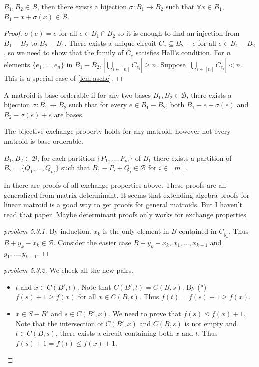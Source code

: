 \documentclass[12pt]{article}
\begin{document}
\begin{theorem}
    $B_1,B_2\in \mathcal B$, then there exists a bijection $\sigma: B_1\to B_2$ such that $\forall x\in B_1$, $B_1-x+\sigma(x)\in \mathcal B$.
\end{theorem}
\begin{proof}
    $\sigma(e)=e$ for all $e\in B_1\cap B_2$ so it is enough to find an injection from $B_1-B_2$ to $B_2-B_1$. There exists a unique circuit $C_e\subseteq B_2+e$ for all $e\in B_1-B_2$, so we need to show that the family of $C_e$ satisfies Hall's condition. For $n$ elements $\{e_1,\ldots,e_n\}$ in $B_1-B_2$, $|\bigcup_{i\in[n]}C_{e_i}|\geq n$. Suppose $|\bigcup_{i\in[n]}C_{e_i}|< n$. This is a special case of \autoref{lem:asche}.
    
\end{proof}
\begin{definition}
    A matroid is base-orderable if for any two bases $B_1,B_2\in \mathcal B$, there exists a bijection $\sigma: B_1\to B_2$ such that for every $e\in B_1-B_2$, both $B_1-e+\sigma(e)$ and $B_2-\sigma(e)+e$ are bases.
\end{definition}

The bijective exchange property holds for any matroid, however not every matroid is base-orderable.

\begin{theorem}
    $B_1,B_2\in \mathcal B$, for each partition $\{P_1,\dots,P_m\}$ of $B_1$ there exists a partition of $B_2=\{Q_1,\dots,Q_m\}$ such that $B_1-P_i+Q_i\in \mathcal B$ for $i\in [m]$.
\end{theorem}

In \cite{Greene_Magnanti_1975} there are proofs of all exchange properties above. These proofs are all generalized from matrix determinant. It seems that extending algebra proofs for linear matroid is a good way to get proofs for general matroids. But I haven't read that paper. Maybe determinant proofs only works for exchange properties.

\begin{proof}[problem 5.3.1]
    By induction. $x_k$ is the only element in $B$ contained in $C_{y_k}$. Thus $B+y_k-x_k\in \mathcal B$. Consider the easier case $B+y_k-x_k$, $x_1,\dots,x_{k-1}$ and $y_1,\dots,y_{k-1}$.
\end{proof}

\begin{proof}[problem 5.3.2]
    We check all the new pairs.
    \begin{itemize}
        \item $t$ and $x\in C(B',t)$. Note that $C(B',t)=C(B,s)$. By (*) $f(s)+1\geq f(x)$ for all $x\in C(B,t)$. Thus $f(t)=f(s)+1\geq f(x)$.
        \item $x\in S-B'$ and $s\in C(B',x)$. We need to prove that $f(s)
        \leq f(x)+1$. Note that the intersection of $C(B',x)$ and $C(B,s)$ is not empty and $t\in C(B,s)$, there exists a circuit containing both $x$ and $t$. Thus $f(s)+1=f(t)\leq f(x)+1$.
    \end{itemize}
\end{proof}
\end{document}
